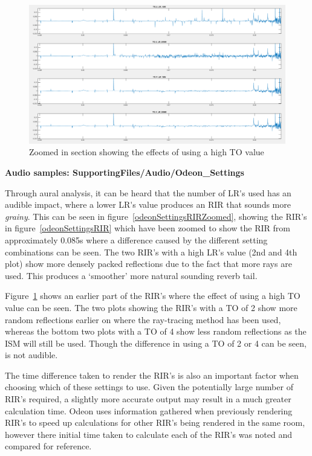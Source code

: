 \documentclass[../../main.tex]{subfiles}
\begin{document}
			\begin{figure}[H]
				\center\includegraphics[scale = 0.3]{Sections/Implementation/Odeon/images/OdeonSettings/settingsFigure_TOZoom.png}
				\caption{Zoomed in section showing the effects of using a high \ac{TO} value}
				\label{odeonSettings_TOZoomed}
			\end{figure}


				\textbf{Audio samples: SupportingFiles/Audio/Odeon\_Settings}

				Through aural analysis, it can be heard that the number of \ac{LR's} used has an audible impact, where a lower \ac{LR's} value produces an \ac{RIR} that sounds more \textit{grainy}. This can be seen in figure~\ref{odeonSettingsRIRZoomed}, showing the \ac{RIR}'s in figure~\ref{odeonSettingsRIR} which have been zoomed to show the \ac{RIR} from approximately 0.085s where a difference caused by the different setting combinations can be seen. The two \ac{RIR}'s with a high \ac{LR's} value (2nd and 4th plot) show more densely packed reflections due to the fact that more rays are used. This produces a `smoother' more natural sounding reverb tail.

				Figure~\ref{odeonSettings_TOZoomed} shows an earlier part of the \ac{RIR}'s where the effect of using a high \ac{TO} value can be seen. The two plots showing the \ac{RIR}'s with a \ac{TO} of 2 show more random reflections earlier on where the ray-tracing method has been used, whereas the bottom two plots with a \ac{TO} of 4 show less random reflections as the \ac{ISM} will still be used. Though the difference in using a \ac{TO} of 2 or 4 can be seen, is not audible.

				The time difference taken to render the \ac{RIR}'s is also an important factor when choosing which of these settings to use. Given the potentially large number of \ac{RIR}'s required, a slightly more accurate output may result in a much greater calculation time. Odeon uses information gathered when previously rendering \ac{RIR}'s to speed up calculations for other \ac{RIR}'s being rendered in the same room, however there initial time taken to calculate each of the \ac{RIR}'s was noted and compared for reference.
\end{document}
